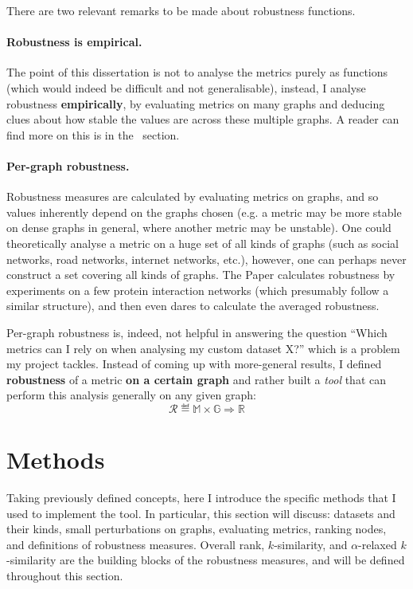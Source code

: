 There are two relevant remarks to be made about robustness functions.

\paragraph*{Robustness is empirical.} The point of this dissertation is not to analyse the metrics purely as functions (which would indeed be difficult and not generalisable), instead, I analyse robustness \textbf{empirically}, by evaluating metrics on many graphs and deducing clues about how stable the values are across these multiple graphs.
A reader can find more on this is in the~ section.

\paragraph*{Per-graph robustness.} Robustness measures are calculated by evaluating metrics on graphs, and so values inherently depend on the graphs chosen (e.g. a metric may be more stable on dense graphs in general, where another metric may be unstable).
One could theoretically analyse a metric on a huge set of all kinds of graphs (such as social networks, road networks, internet networks, etc.), however, one can perhaps never construct a set covering all kinds of graphs.
The Paper calculates robustness by experiments on a few protein interaction networks (which presumably follow a similar structure), and then even dares to calculate the averaged robustness.

Per-graph robustness is, indeed, not helpful in answering the question ``Which metrics can I rely on when analysing my custom dataset X?'' which is a problem my project tackles.
Instead of coming up with more-general results, I defined \textbf{robustness} of a metric \textbf{on a certain graph} and rather built a \textsl{tool} that can perform this analysis generally on any given graph:
\begin{equation}
    \mathcal{R} \eqdef \mathbb{M} \times \mathbb{G} \Rightarrow \mathbb{R}
\end{equation}


\section{Methods}\label{sec:methods}

Taking previously defined concepts, here I introduce the specific methods that I used to implement the \graffs tool.
In particular, this section will discuss: datasets and their kinds, small perturbations on graphs, evaluating metrics, ranking nodes, and definitions of robustness measures.
Overall rank, $k$-similarity, and $\alpha$-relaxed $k$-similarity are the building blocks of the robustness measures, and will be defined throughout this section.

